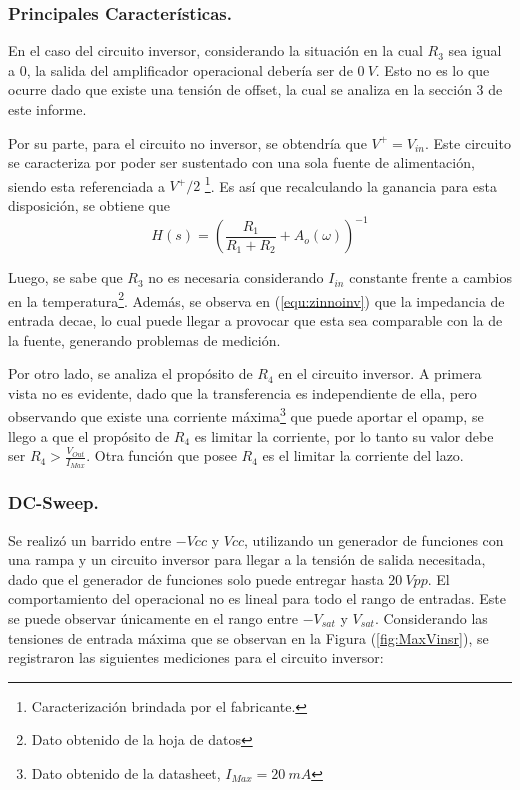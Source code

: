 \subsubsection{Principales Características.}
En el caso del circuito inversor, considerando la situación en la cual $R_3$ sea igual a 0, la salida del amplificador operacional debería ser de $0 \ V$. Esto no es lo que ocurre dado que existe una tensión de offset, la cual se analiza en la sección 3 de este informe.

Por su parte, para el circuito no inversor, se obtendría que $V^+ = V_{in}$. Este circuito se caracteriza por poder ser sustentado con una sola fuente de alimentación, siendo esta referenciada a $V^+/2$ \footnote{Caracterización brindada por el fabricante.}. Es así que recalculando la ganancia para esta disposición, se obtiene que 
\[
	H \left(s \right) = \left( \frac{R_1}{R_1 + R_2} + A_o\left( \omega \right) \right)^{-1}
\]

Luego, se sabe que $R_3$ no es necesaria considerando $I_{in}$ constante frente a cambios en la temperatura\footnote{Dato obtenido de la hoja de datos}. Además, se observa en (\ref{equ:zinnoinv}) que la impedancia de entrada decae, lo cual puede llegar a provocar que esta sea comparable con la de la fuente, generando problemas de medición.

Por otro lado, se analiza el propósito de $R_4$ en el circuito inversor. A primera vista no es evidente, dado que la transferencia es independiente de ella, pero observando que existe una corriente máxima\footnote{Dato obtenido de la datasheet, $I_{Max}=20 \ mA$} que puede aportar el opamp, se llego a que el propósito de $R_4$ es limitar la corriente, por lo tanto su valor debe ser $R_4>\frac{V_{Out}}{I_{Max}}$. Otra función que posee $R_4$ es el limitar la corriente del lazo.

\subsubsection{DC-Sweep.}
Se realizó un barrido entre $-Vcc$ y $Vcc$, utilizando un generador de funciones con una rampa y un circuito inversor para llegar a la tensión de salida necesitada, dado que el generador de funciones solo puede entregar hasta $20 \ Vpp$.
El comportamiento del operacional no es lineal para todo el rango de entradas. Este se puede observar únicamente en el rango entre $-V_{sat}$ y $V_{sat}$. Considerando las tensiones de entrada máxima que se observan en la Figura (\ref{fig:MaxVinsr}), se registraron las siguientes mediciones para el circuito inversor:

